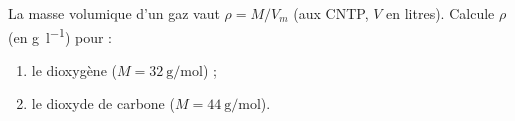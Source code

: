 \documentclass[11pt,a4paper]{article}
\begin{document}
\begin{exo}
La masse volumique d'un gaz vaut $\rho = M / V_m$ (aux CNTP, $V$ en litres). Calcule $\rho$ (en \si{\gram\per\litre}) pour :
\begin{enumerate}[label=\alph*)]
  \item le dioxygène  ($M = \SI{32}{\gram\per\mole}$) ;
  \item le dioxyde de carbone  ($M = \SI{44}{\gram\per\mole}$).
\end{enumerate}
\end{exo}
\end{document}
